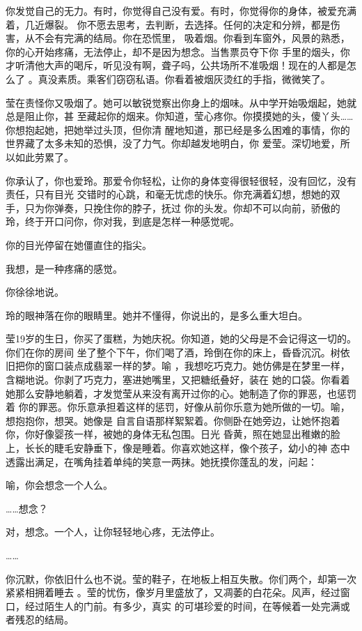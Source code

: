 \documentclass[12pt,a4paper]{article}
\begin{document}
		你发觉自己的无力。有时，你觉得自己没有爱。有时，你觉得你的身体，被爱充满着，几近爆裂。
	你不愿去思考，去判断，去选择。任何的决定和分辨，都是伤害，从不会有完满的结局。你在恐慌里，
	吸着烟。你看到车窗外，风景的熟悉，你的心开始疼痛，无法停止，却不是因为想念。当售票员夺下你
	手里的烟头，你才听清他大声的喝斥，听见没有啊，聋子吗，公共场所不准吸烟！现在的人都是怎么了
	。真没素质。乘客们窃窃私语。你看着被烟灰烫红的手指，微微笑了。

		莹在责怪你又吸烟了。她可以敏锐觉察出你身上的烟味。从中学开始吸烟起，她就总是阻止你，甚
	至藏起你的烟来。你知道，莹心疼你。你摸摸她的头，傻丫头…… 你想抱起她，把她举过头顶，但你清
	醒地知道，那已经是多么困难的事情，你的世界藏了太多未知的恐惧，没了力气。你却越发地明白，你
	爱莹。深切地爱，所以如此劳累了。


		你承认了，你也爱玲。那爱令你轻松，让你的身体变得很轻很轻，没有回忆，没有责任，只有目光
	交错时的心跳，和毫无忧虑的快乐。你充满着幻想，想她的双手，只为你弹奏，只挽住你的脖子，抚过
	你的头发。你却不可以向前，骄傲的玲，终于开口问你，你对我，到底是怎样一种感觉呢。

		你的目光停留在她僵直住的指尖。

		我想，是一种疼痛的感觉。

		你徐徐地说。

		玲的眼神落在你的眼睛里。她并不懂得，你说出的，是多么重大坦白。

		莹19岁的生日，你买了蛋糕，为她庆祝。你知道，她的父母是不会记得这一切的。你们在你的房间
	坐了整个下午，你们喝了酒，玲倒在你的床上，昏昏沉沉。树依旧把你的窗口装点成翡翠一样的梦。喻
	，我想吃巧克力。她仿佛是在梦里一样，含糊地说。你剥了巧克力，塞进她嘴里，又把糖纸叠好，装在
	她的口袋。你看着她那么安静地躺着，才发觉莹从来没有离开过你的心。她制造了你的罪恶，也惩罚着
	你的罪恶。你乐意承担着这样的惩罚，好像从前你乐意为她所做的一切。喻，想抱抱你，想哭。她像是
	自言自语那样絮絮着。你侧卧在她旁边，让她怀抱着你，你好像婴孩一样，被她的身体无私包围。日光
	昏黄，照在她显出稚嫩的脸上，长长的睫毛安静垂下，像是睡着。你喜欢她这样，像个孩子，幼小的神
	态中透露出满足，在嘴角挂着单纯的笑意一两抹。她抚摸你蓬乱的发，问起：

		喻，你会想念一个人么。

		……想念？

		对，想念。一个人，让你轻轻地心疼，无法停止。

		……

		你沉默，你依旧什么也不说。莹的鞋子，在地板上相互失散。你们两个，却第一次紧紧相拥着睡去
	。莹的忧伤，像岁月里盛放了，又凋萎的白花朵。风声，经过窗口，经过陌生人的门前。有多少，真实
	的可堪珍爱的时间，在等候着一处完满或者残忍的结局。
\end{document}
